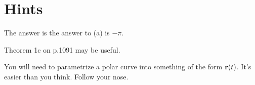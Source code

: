 \newpage

\section{Hints}
\begin{hint}
  The answer is the answer to (a) is $-\pi$.
\end{hint}

\begin{hint}
  Theorem 1c on p.1091 may be useful.
\end{hint}

\begin{hint}
  You will need to parametrize a polar curve into something of the form $\mathbf r(t)$. It's easier than you think. Follow your nose.
\end{hint}
